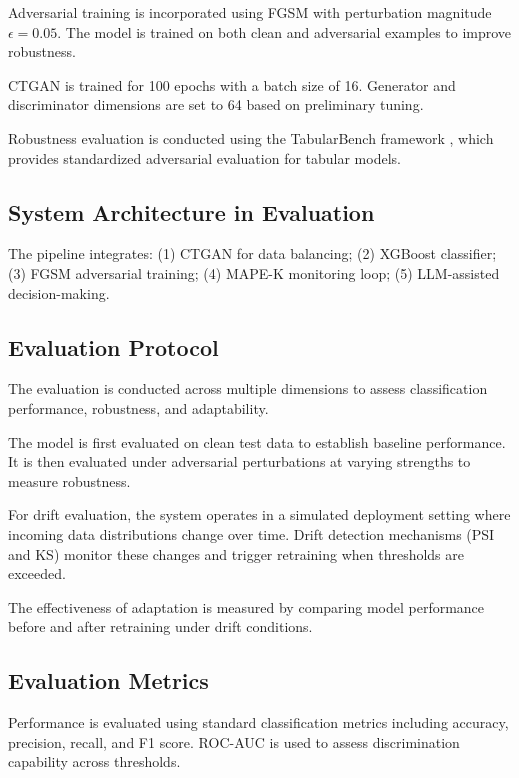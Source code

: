 \documentclass{svproc}
\begin{document}
Adversarial training is incorporated using FGSM \cite{madry2018adversarial} with perturbation magnitude $\epsilon = 0.05$. The model is trained on both clean and adversarial examples to improve robustness.

CTGAN \cite{xu2019ctgan} is trained for 100 epochs with a batch size of 16. Generator and discriminator dimensions are set to 64 based on preliminary tuning.

Robustness evaluation is conducted using the TabularBench framework \cite{simonetto2024tabularbench}, which provides standardized adversarial evaluation for tabular models.

\subsection{System Architecture in Evaluation}

The pipeline integrates: (1) CTGAN for data balancing; (2) XGBoost classifier; (3) FGSM adversarial training; (4) MAPE-K monitoring loop; (5) LLM-assisted decision-making.

\subsection{Evaluation Protocol}

The evaluation is conducted across multiple dimensions to assess classification performance, robustness, and adaptability.

The model is first evaluated on clean test data to establish baseline performance. It is then evaluated under adversarial perturbations at varying strengths to measure robustness.

For drift evaluation, the system operates in a simulated deployment setting where incoming data distributions change over time. Drift detection mechanisms (PSI and KS) monitor these changes and trigger retraining when thresholds are exceeded.

The effectiveness of adaptation is measured by comparing model performance before and after retraining under drift conditions.

\subsection{Evaluation Metrics}

Performance is evaluated using standard classification metrics including accuracy, precision, recall, and F1 score. ROC-AUC is used to assess discrimination capability across thresholds.
\end{document}
